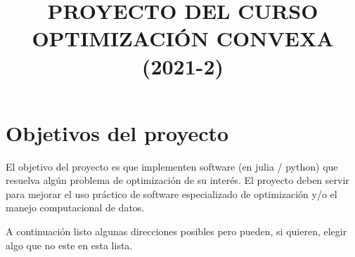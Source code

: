 \documentclass[12pt, a4paper]{article}
\begin{document}
\title{PROYECTO DEL CURSO OPTIMIZACI\'ON CONVEXA (2021-2)}
\maketitle

\section{Objetivos del proyecto}
El objetivo del proyecto es que implementen software (en julia / python) que resuelva alg\'un problema de optimizaci\'on de su inter\'es. El proyecto deben servir para mejorar el uso pr\'actico de software especializado de optimizaci\'on y/o el manejo computacional de datos.

A continuaci\'on listo algunas direcciones posibles pero pueden, si quieren, elegir algo que no este en esta lista. 
\end{document}
